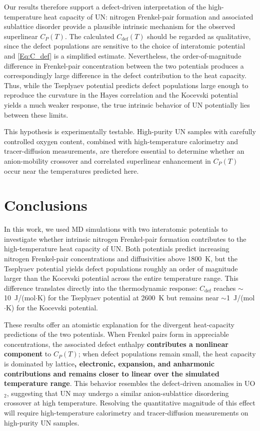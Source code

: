 \documentclass[preprint,12pt,sort&compress]{elsarticle}
\newcommand{\?}{\stackrel{?}{=}}
\providecommand{\DIFaddtex}[1]{{\bf #1}} %
\providecommand{\DIFdeltex}[1]{} %
\providecommand{\DIFaddbegin}{\protect\color{blue}} %
\providecommand{\DIFaddend}{\protect\color{black}} %
\providecommand{\DIFdelbegin}{\protect\color{red}} %
\providecommand{\DIFdelend}{\protect\color{black}} %
\providecommand{\DIFadd}[1]{\texorpdfstring{\DIFaddtex{#1}}{#1}} %
\providecommand{\DIFdel}[1]{\texorpdfstring{\DIFdeltex{#1}}{}} %
\newcommand{\DIFscaledelfig}{0.5}
\newlength{\DIFdelgraphicswidth} %
\newlength{\DIFdelgraphicsheight} %
\newcommand{\DIFaddincludegraphics}[2][]{{\color{blue}\fbox{\DIFOincludegraphics[#1]{#2}}}} %
\newcommand{\DIFdelincludegraphics}[2][]{%
\sbox{\DIFdelgraphicsbox}{\DIFOincludegraphics[#1]{#2}}%
\settoboxwidth{\DIFdelgraphicswidth}{\DIFdelgraphicsbox} %
\settoboxtotalheight{\DIFdelgraphicsheight}{\DIFdelgraphicsbox} %
\scalebox{\DIFscaledelfig}{%
\parbox[b]{\DIFdelgraphicswidth}{\usebox{\DIFdelgraphicsbox}\\[-\baselineskip] \rule{\DIFdelgraphicswidth}{0em}}\llap{\resizebox{\DIFdelgraphicswidth}{\DIFdelgraphicsheight}{%
\setlength{\unitlength}{\DIFdelgraphicswidth}%
\begin{picture}(1,1)%
\thicklines\linethickness{2pt} %
{\color[rgb]{1,0,0}\put(0,0){\framebox(1,1){}}}%
{\color[rgb]{1,0,0}\put(0,0){\line( 1,1){1}}}%
{\color[rgb]{1,0,0}\put(0,1){\line(1,-1){1}}}%
\end{picture}%
}\hspace*{3pt}}} %
} %
\DeclareRobustCommand{\DIFaddbegin}{\DIFOaddbegin \let\includegraphics\DIFaddincludegraphics} %
\DeclareRobustCommand{\DIFaddend}{\DIFOaddend \let\includegraphics\DIFOincludegraphics} %
\DeclareRobustCommand{\DIFdelbegin}{\DIFOdelbegin \let\includegraphics\DIFdelincludegraphics} %
\DeclareRobustCommand{\DIFdelend}{\DIFOaddend \let\includegraphics\DIFOincludegraphics} %
\begin{document}
Our results therefore support a defect-driven interpretation of the high-temperature heat capacity of UN: nitrogen Frenkel-pair formation and associated sublattice disorder provide a plausible intrinsic mechanism for the observed superlinear $C_P(T)$. The calculated $C_{\mathrm{def}}(T)$ should be regarded as qualitative, since the defect populations are sensitive to the choice of interatomic potential and \cref{Eq:C_def} is a simplified estimate. Nevertheless, the order-of-magnitude difference in Frenkel-pair concentration between the two potentials produces a correspondingly large difference in the defect contribution to the heat capacity. Thus, while the Tseplyaev potential predicts defect populations large enough to reproduce the curvature in the Hayes correlation and the Kocevski potential yields a much weaker response, the true intrinsic behavior of UN potentially lies between these limits.

This hypothesis is experimentally testable. High-purity UN samples with carefully controlled oxygen content, combined with high-temperature calorimetry and tracer-diffusion measurements, are therefore essential to determine whether an anion-mobility crossover and correlated superlinear enhancement in $C_P(T)$ occur near the temperatures predicted here.

\section{Conclusions}

In this work, we used MD simulations with two interatomic potentials to investigate whether intrinsic nitrogen Frenkel-pair formation contributes to the high-temperature heat capacity of UN. Both potentials predict increasing nitrogen Frenkel-pair concentrations and diffusivities above 1800~K, but the Tseplyaev potential yields defect populations roughly an order of magnitude larger than the Kocevski potential across the entire temperature range. This difference translates directly into the thermodynamic response: $C_\text{def}$ reaches $\sim$10~J/(mol$\cdot$K) for the Tseplyaev potential at 2600~K but remains near $\sim$1~J/(mol$\cdot$K) for the Kocevski potential.

These results offer an atomistic explanation for the divergent heat-capacity predictions of the two potentials. When Frenkel pairs form in appreciable concentrations, the associated defect enthalpy \DIFdelbegin \DIFdel{produces a superlinear contribution }\DIFdelend \DIFaddbegin \DIFadd{contributes a nonlinear component }\DIFaddend to $C_P(T)$; when defect populations remain small, the heat capacity is dominated by lattice\DIFdelbegin \DIFdel{vibrations and remains nearly linear }\DIFdelend \DIFaddbegin \DIFadd{, electronic, expansion, and anharmonic contributions and remains closer to linear over the simulated temperature range}\DIFaddend . This behavior resembles the defect-driven anomalies in UO$_2$, suggesting that UN may undergo a similar anion-sublattice disordering crossover at high temperature. Resolving the quantitative magnitude of this effect will require high-temperature calorimetry and tracer-diffusion measurements on high-purity UN samples.
\end{document}
